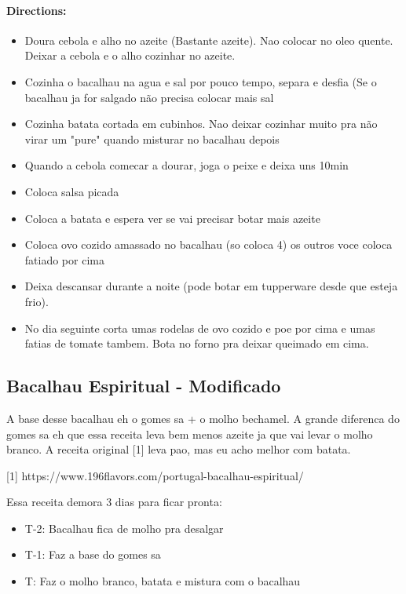\documentclass{article}
\begin{document}
\paragraph{Directions:}
\begin{itemize}
	\item Doura cebola e alho no azeite (Bastante azeite). Nao colocar no oleo quente. Deixar a cebola e o alho cozinhar no azeite.
	\item Cozinha o bacalhau na agua e sal por pouco tempo, separa e desfia (Se o bacalhau ja for salgado não precisa colocar mais sal
	\item Cozinha batata cortada em cubinhos. Nao deixar cozinhar muito pra não virar um "pure" quando misturar no bacalhau depois
	\item Quando a cebola comecar a dourar, joga o peixe e deixa uns 10min
	\item Coloca salsa picada
	\item Coloca a batata e espera ver se vai precisar botar mais azeite
	\item Coloca ovo cozido amassado no bacalhau (so coloca 4) os outros voce coloca fatiado por cima
	\item Deixa descansar durante a noite (pode botar em tupperware desde que esteja frio).
	\item No dia seguinte corta umas rodelas de ovo cozido e poe por cima e umas fatias de tomate tambem. Bota no forno pra deixar  queimado em cima.
\end{itemize}

\subsection{Bacalhau Espiritual - Modificado}

A base desse bacalhau eh o gomes sa + o molho bechamel. A grande diferenca do gomes sa eh que essa receita leva bem menos azeite ja que vai levar o molho branco. A receita original [1] leva pao, mas eu acho melhor com batata.

[1] https://www.196flavors.com/portugal-bacalhau-espiritual/

Essa receita demora 3 dias para ficar pronta:
\begin{itemize}
	\item T-2: Bacalhau fica de molho pra desalgar
	\item T-1: Faz a base do gomes sa
	\item T: Faz o molho branco, batata e mistura com o bacalhau
\end{itemize}
\end{document}
